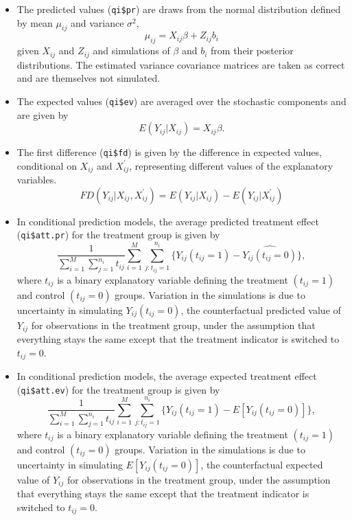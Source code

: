 \begin{itemize}

\item The predicted values ({\tt qi\$pr}) are draws from the normal distribution defined by mean $\mu_{ij}$ and variance $\sigma^2$,
\begin{equation*}
\mu_{ij} = X_{ij} \beta + Z_{ij} b_{i}
\end{equation*}
given $X_{ij}$ and $Z_{ij}$ and simulations of $\beta$ and $b_i$ from their posterior distributions. The estimated variance covariance matrices are taken as correct and are themselves not simulated.

\item The expected values ({\tt qi\$ev}) are averaged over the stochastic components and are given by
\begin{equation*}
E(Y_{ij} | X_{ij}) = X_{ij} \beta.
\end{equation*}

\item The first difference ({\tt qi\$fd}) is given by the difference in expected values, conditional on $X_{ij}$ and $X_{ij}^\prime$, representing different values of the explanatory variables.
\begin{equation*}
FD(Y_{ij} | X_{ij}, X_{ij}^\prime) = E(Y_{ij} | X_{ij}) - E(Y_{ij} | X_{ij}^\prime)
\end{equation*}

\item In conditional prediction models, the average predicted treatment effect ({\tt qi\$att.pr}) for the treatment group is given by
\begin{equation*}
\frac{1}{\sum_{i = 1}^M \sum_{j = 1}^{n_i} t_{ij}} \sum_{i = 1}^M \sum_{j:t_{ij} = 1}^{n_i} \{ Y_{ij} (t_{ij} = 1) - \widehat{Y_{ij}(t_{ij} = 0)} \},
\end{equation*}
where $t_{ij}$ is a binary explanatory variable defining the treatment $(t_{ij} = 1)$ and control $(t_{ij} = 0)$ groups. Variation in the simulations is due to uncertainty in simulating $Y_{ij}(t_{ij} = 0)$, the counterfactual predicted value of $Y_{ij}$ for observations in the treatment group, under the assumption that everything stays the same except that the treatment indicator is switched to $t_{ij} = 0$.

\item In conditional prediction models, the average expected treatment effect ({\tt qi\$att.ev}) for the treatment group is given by
\begin{equation*}
\frac{1}{\sum_{i = 1}^M \sum_{j = 1}^{n_i} t_{ij}} \sum_{i = 1}^M \sum_{j:t_{ij} = 1}^{n_i} \{ Y_{ij} (t_{ij} = 1) - E[Y_{ij}(t_{ij} = 0)] \},
\end{equation*}
where $t_{ij}$ is a binary explanatory variable defining the treatment $(t_{ij} = 1)$ and control $(t_{ij} = 0)$ groups. Variation in the simulations is due to uncertainty in simulating $E[Y_{ij}(t_{ij} = 0)]$, the counterfactual expected value of $Y_{ij}$ for observations in the treatment group, under the assumption that everything stays the same except that the treatment indicator is switched to $t_{ij} = 0$.


\end{itemize}
